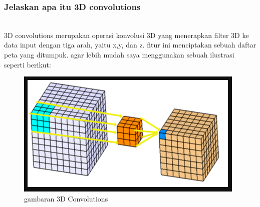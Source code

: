 \subsubsection{Jelaskan apa itu 3D convolutions}
\hfill\\
3D convolutions merupakan operasi konvolusi 3D yang menerapkan filter 3D ke data input dengan tiga arah, yaitu x,y, dan z. fitur ini menciptakan sebuah daftar peta yang ditumpuk. agar lebih mudah saya menggunakan sebuah ilustrasi seperti berikut:
\begin{figure}[H]
	\centering
	\includegraphics[scale=0.5]{figures/1174087/8/p1.png}
	\caption{gambaran 3D Convolutions}
\end{figure}

